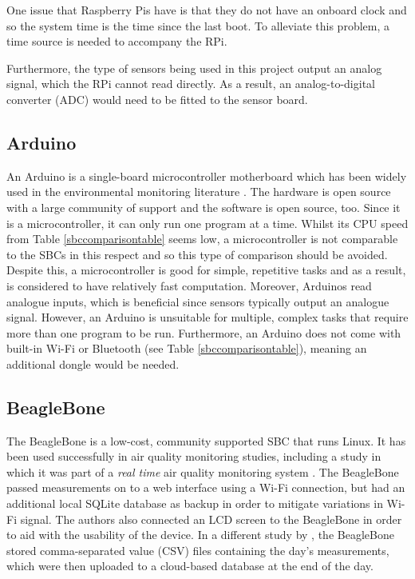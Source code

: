 \documentclass[11pt]{report}
\begin{document}
One issue that Raspberry Pis have is that they do not have an onboard clock and so the system time is the time since the last boot. To alleviate this problem, a time source is needed to accompany the RPi.

Furthermore, the type of sensors being used in this project output an analog signal, which the RPi cannot read directly. As a result, an analog-to-digital converter (ADC) would need to be fitted to the sensor board.

\subsection{Arduino}

An Arduino is a single-board microcontroller motherboard which has been widely used in the environmental monitoring literature \citep{2014busairqualityVSN,Devarakonda2013,Balasubramaniyan2016AQMS_RPi,sun2016HKmarathonML,Ferdoush2014rasppiandarduino,Lee2014arduinorestful,Alvear2016ecosensor,Fuertes2016realtime,Piedrahita2014quantexposuremtrng,Abraham2014costeffindoor}. The hardware is open source with a large community of support and the software is open source, too. Since it is a microcontroller, it can only run one program at a time. Whilst its CPU speed from Table \ref{sbccomparisontable} seems low, a microcontroller is not comparable to the SBCs in this respect and so this type of comparison should be avoided. Despite this, a microcontroller is good for simple, repetitive tasks and as a result, is considered to have relatively fast computation. Moreover, Arduinos read analogue inputs, which is beneficial since sensors typically output an analogue signal. However, an Arduino is unsuitable for multiple, complex tasks that require more than one program to be run. Furthermore, an Arduino does not come with built-in Wi-Fi or Bluetooth (see Table \ref{sbccomparisontable}), meaning an additional dongle would be needed.

\subsection{BeagleBone}

The BeagleBone is a low-cost, community supported SBC that runs Linux. It has been used successfully in air quality monitoring studies, including a study in which it was part of a \textit{real time} air quality monitoring system \citep{Min2014airfeedbeagle}. The BeagleBone passed measurements on to a web interface using a Wi-Fi connection, but had an additional local SQLite database as backup in order to mitigate variations in Wi-Fi signal. The authors also connected an LCD screen to the BeagleBone in order to aid with the usability of the device. In a different study by \cite{Desai2017beagleboneblack}, the BeagleBone stored comma-separated value (CSV) files containing the day's measurements, which were then uploaded to a cloud-based database at the end of the day. 
\end{document}
